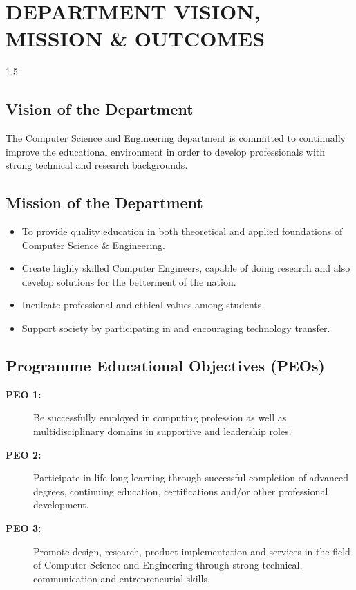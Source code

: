 \chapter*{DEPARTMENT VISION, MISSION \& OUTCOMES}

\begin{spacing}{1.5}
\section*{Vision of the Department}
The Computer Science and Engineering department is committed to continually improve the educational environment in order to develop professionals with strong technical and research backgrounds.

\section*{Mission of the Department}
\begin{itemize}
    \item To provide quality education in both theoretical and applied foundations of Computer Science \& Engineering.
    \item Create highly skilled Computer Engineers, capable of doing research and also develop solutions for the betterment of the nation.
    \item Inculcate professional and ethical values among students.
    \item Support society by participating in and encouraging technology transfer.
\end{itemize}

\section*{Programme Educational Objectives (PEOs)}
\begin{description}
    \item[\textbf{PEO 1:}] Be successfully employed in computing profession as well as multidisciplinary domains in supportive and leadership roles.
    \item[\textbf{PEO 2:}] Participate in life-long learning through successful completion of advanced degrees, continuing education, certifications and/or other professional development.
    \item[\textbf{PEO 3:}] Promote design, research, product implementation and services in the field of Computer Science and Engineering through strong technical, communication and entrepreneurial skills.
\end{description}


\end{spacing}
